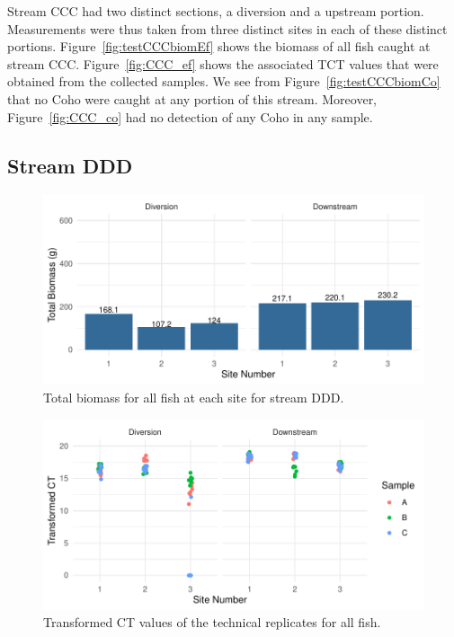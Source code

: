 Stream CCC had two distinct sections, a diversion and a upstream portion. Measurements were thus taken from three distinct sites in each of these distinct portions. Figure~\ref{fig:testCCCbiomEf} shows the biomass of all fish caught at stream CCC. Figure~\ref{fig:CCC_ef} shows the associated TCT values that were obtained from the collected samples.
We see from Figure~\ref{fig:testCCCbiomCo} that no Coho were caught at any portion of this stream. Moreover, Figure~\ref{fig:CCC_co} had no detection of any Coho in any sample.

\newpage

\subsection{Stream DDD}



\begin{figure}[H]
\centering
\includegraphics{Chapter5Images/DDD_Ef_new.pdf}
\caption{  \hspace{1mm}Total biomass for all fish at each site for stream DDD.}
\label{fig:testDDDef}
\end{figure}



\begin{figure}[H]
\centering
\includegraphics{Chapter5Images/DDD_ef_tct.pdf}
\caption{  \hspace{1mm}Transformed CT values of the technical replicates for all fish.}
\label{fig:DDD_ef}
\end{figure}

